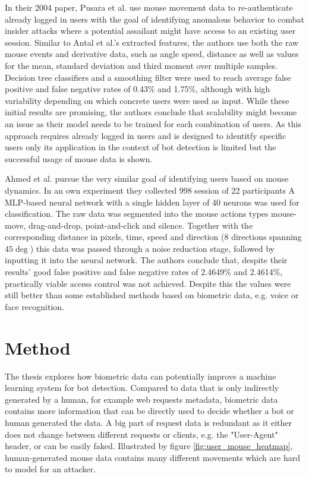 \documentclass[
    fontsize=12pt,
    headings=small,
    parskip=half,           %
    bibliography=totoc,
    numbers=noenddot,       %
    open=any,               %
    final                   %
]{scrreprt}
\begin{document}
In their 2004 paper, Pusara et al. \cite{10.1145/1029208.1029210} use mouse movement data to re-authenticate already logged in users with the goal of identifying anomalous behavior to combat insider attacks where a potential assailant might have access to an existing user session. Similar to Antal et al.'s \cite{https://doi.org/10.1049/iet-bmt.2018.5126} extracted features, the authors use both the raw mouse events and derivative data, such as angle speed, distance as well as values for the mean, standard deviation and third moment over multiple samples. Decision tree classifiers and a smoothing filter were used to reach average false positive and false negative rates of 0.43\% and 1.75\%, although with high variability depending on which concrete users were used as input. While these initial results are promising, the authors conclude that scalability might become an issue as their model needs to be trained for each combination of users. As this approach requires already logged in users and is designed to identitfy specific users only its application in the context of bot detection is limited but the successful usage of mouse data is shown.

Ahmed et al. pursue the very similar goal of identifying users based on mouse dynamics. In an own experiment they collected 998 session of 22 participants
A MLP-based neural network with a single hidden layer of 40 neurons was used for classification. The raw data was segmented into the mouse actions types mouse-move, drag-and-drop, point-and-click and silence. Together with the corresponding distance in pixels, time, speed and direction (8 directions spanning $45\deg$) this data was passed through a noise reduction stage, followed by inputting it into the neural network. The authors conclude that, despite their results' good false positive and false negative rates of 2.4649\% and 2.4614\%, practically viable access control was not achieved. Despite this the values were still better than some established methods based on biometric data, e.g. voice or face recognition.


\chapter{Method}

The thesis explores how biometric data can potentially improve a machine learning system for bot detection. Compared to data that is only indirectly generated by a human, for example web requests metadata, biometric data contains more information that can be directly used to decide whether a bot or human generated the data. A big part of request data is redundant as it either does not change between different requests or clients, e.g. the "User-Agent" header, or can be easily faked. Illustrated by figure \ref{fig:user_mouse_heatmap}, human-generated mouse data contains many different movements which are hard to model for an attacker.
\end{document}
